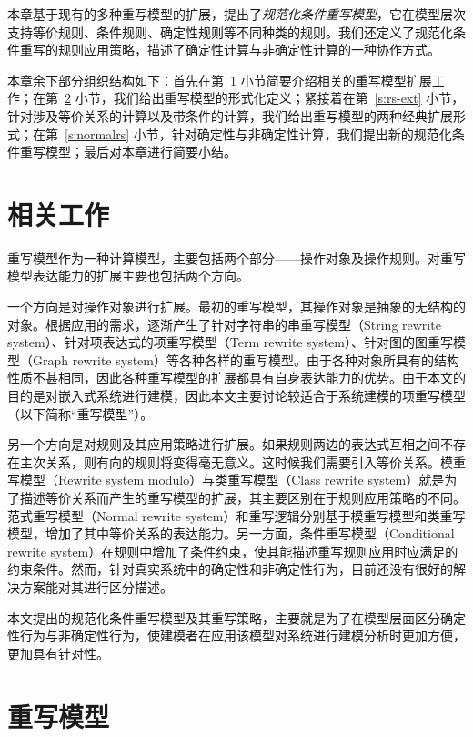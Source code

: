 本章基于现有的多种重写模型的扩展，提出了\emph{规范化条件重写模型}，它在模型层次支持等价规则、条件规则、确定性规则等不同种类的规则。我们还定义了规范化条件重写的规则应用策略，描述了确定性计算与非确定性计算的一种协作方式。

本章余下部分组织结构如下：首先在第~\ref{s:rs-related} 小节简要介绍相关的重写模型扩展工作；在第~\ref{s:rewritesystem} 小节，我们给出重写模型的形式化定义；紧接着在第~\ref{s:rs-ext} 小节，针对涉及等价关系的计算以及带条件的计算，我们给出重写模型的两种经典扩展形式；在第~\ref{s:normalrs} 小节，针对确定性与非确定性计算，我们提出新的规范化条件重写模型；最后对本章进行简要小结。

\section{相关工作}
\label{s:rs-related}

重写模型作为一种计算模型，主要包括两个部分——操作对象及操作规则。对重写模型表达能力的扩展主要也包括两个方向。

一个方向是对操作对象进行扩展。最初的重写模型，其操作对象是抽象的无结构的对象。根据应用的需求，逐渐产生了针对字符串的串重写模型（String rewrite system）、针对项表达式的项重写模型（Term rewrite system）、针对图的图重写模型（Graph rewrite system）等各种各样的重写模型。由于各种对象所具有的结构性质不甚相同，因此各种重写模型的扩展都具有自身表达能力的优势。由于本文的目的是对嵌入式系统进行建模，因此本文主要讨论较适合于系统建模的项重写模型（以下简称“重写模型”）。

另一个方向是对规则及其应用策略进行扩展。如果规则两边的表达式互相之间不存在主次关系，则有向的规则将变得毫无意义。这时候我们需要引入等价关系。模重写模型（Rewrite system modulo）与类重写模型（Class rewrite system）就是为了描述等价关系而产生的重写模型的扩展，其主要区别在于规则应用策略的不同。范式重写模型（Normal rewrite system）和重写逻辑分别基于模重写模型和类重写模型，增加了其中等价关系的表达能力。另一方面，条件重写模型（Conditional rewrite system）在规则中增加了条件约束，使其能描述重写规则应用时应满足的约束条件。然而，针对真实系统中的确定性和非确定性行为，目前还没有很好的解决方案能对其进行区分描述。

本文提出的规范化条件重写模型及其重写策略，主要就是为了在模型层面区分确定性行为与非确定性行为，使建模者在应用该模型对系统进行建模分析时更加方便，更加具有针对性。

\section{重写模型} 
\label{s:rewritesystem}

